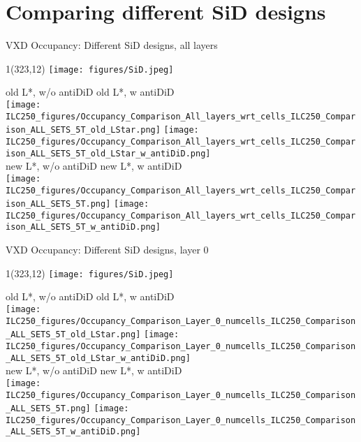 \documentclass[xcolor={dvipsnames}]{beamer}
\newcommand{\sidlogo}{
  \setlength{\TPHorizModule}{1pt}
  \setlength{\TPVertModule}{1pt}
  \begin{textblock}{1}(323,12)
   \texttt{[image: figures/SiD.jpeg]}
  \end{textblock}
  }
\begin{document}
\section{Comparing different SiD designs}
\begin{frame}{VXD Occupancy: Different SiD designs, all layers}
\sidlogo
\begin{center}
\footnotesize old L*, w/o antiDiD \hfill old L*, w antiDiD \\
\texttt{[image: ILC250\_figures/Occupancy\_Comparison\_All\_layers\_wrt\_cells\_ILC250\_Comparison\_ALL\_SETS\_5T\_old\_LStar.png]}\hfill
\texttt{[image: ILC250\_figures/Occupancy\_Comparison\_All\_layers\_wrt\_cells\_ILC250\_Comparison\_ALL\_SETS\_5T\_old\_LStar\_w\_antiDiD.png]}\\
new L*, w/o antiDiD  \hfill new L*, w antiDiD\\
\texttt{[image: ILC250\_figures/Occupancy\_Comparison\_All\_layers\_wrt\_cells\_ILC250\_Comparison\_ALL\_SETS\_5T.png]}\hfill
\texttt{[image: ILC250\_figures/Occupancy\_Comparison\_All\_layers\_wrt\_cells\_ILC250\_Comparison\_ALL\_SETS\_5T\_w\_antiDiD.png]}
\end{center}
\end{frame}
\begin{frame}{VXD Occupancy: Different SiD designs, layer 0}
\sidlogo
\begin{center}
\footnotesize old L*, w/o antiDiD \hfill old L*, w antiDiD \\
\texttt{[image: ILC250\_figures/Occupancy\_Comparison\_Layer\_0\_numcells\_ILC250\_Comparison\_ALL\_SETS\_5T\_old\_LStar.png]}\hfill
\texttt{[image: ILC250\_figures/Occupancy\_Comparison\_Layer\_0\_numcells\_ILC250\_Comparison\_ALL\_SETS\_5T\_old\_LStar\_w\_antiDiD.png]}\\
new L*, w/o antiDiD  \hfill new L*, w antiDiD\\
\texttt{[image: ILC250\_figures/Occupancy\_Comparison\_Layer\_0\_numcells\_ILC250\_Comparison\_ALL\_SETS\_5T.png]}\hfill
\texttt{[image: ILC250\_figures/Occupancy\_Comparison\_Layer\_0\_numcells\_ILC250\_Comparison\_ALL\_SETS\_5T\_w\_antiDiD.png]}
\end{center}
\end{frame}
\end{document}
